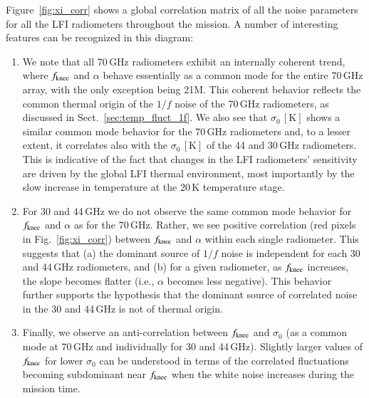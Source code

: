 \documentclass[twocolumn]{aa}
\begin{document}
Figure~\ref{fig:xi_corr} shows a global correlation matrix of all the noise
parameters for all the LFI radiometers throughout the mission.
A number of interesting features can be recognized in this diagram:
\begin{enumerate}
	\item
	We note that all 70\,GHz radiometers exhibit an internally coherent trend, where $f_{\rm knee}$ and $\alpha$ behave essentially as a common mode for the entire 70\,GHz array, with the only exception being 21M. This coherent behavior reflects the common thermal origin of the $1/f$ noise of the 70\,GHz radiometers, as discussed in Sect.~\ref{sec:temp_fluct_1f}. We also see that $\sigma_0 \,\mathrm{[K]}$ shows a similar common mode behavior for the 70\,GHz radiometers and, to a lesser extent, it correlates also with the $\sigma_0 \,\mathrm{[K]}$ of the 44 and 30\,GHz radiometers. This is indicative of the fact that changes in the LFI radiometers’ sensitivity are driven by the global LFI thermal environment, most importantly by the slow increase in temperature at the 20\,K temperature stage.
	
	\item
	For 30 and 44\,GHz we do not observe the same common mode behavior for
        $f_{\rm knee}$ and $\alpha$ as for the 70\,GHz. Rather, we see positive
        correlation (red pixels in Fig.~\ref{fig:xi_corr}) between $f_{\rm
        knee}$ and $\alpha$ within each single radiometer. This suggests that
        (a) the dominant source of $1/f$ noise is independent for each 30 and
        44\,GHz radiometers, and (b) for a given radiometer, as $f_{\rm knee}$
        increases, the slope becomes flatter (i.e., $\alpha$ becomes less negative). This behavior further supports the hypothesis that the dominant source of correlated noise in the 30 and 44\,GHz is not of thermal origin.
	
	\item
	Finally, we observe an anti-correlation between $f_{\rm knee}$ and $\sigma_0$ (as a common mode at 70\,GHz and individually for 30 and 44\,GHz). Slightly larger values of $f_{\rm knee}$ for lower $\sigma_0$ can be understood in terms of the correlated fluctuations becoming subdominant near $f_{\rm knee}$ when the white noise increases during the mission time.
	
\end{enumerate}
\end{document}
